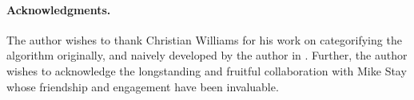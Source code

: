 \paragraph{Acknowledgments.}
The author wishes to thank Christian Williams for his work on
categorifying the algorithm originally, and naively developed by the
author in \cite{DBLP:conf/tgc/MeredithR05}. Further, the author wishes
to acknowledge the longstanding and fruitful collaboration with Mike
Stay whose friendship and engagement have been invaluable.
